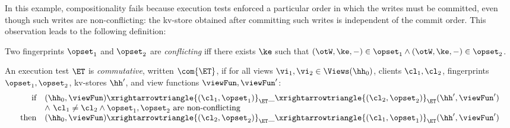 In this example, compositionality fails because execution tests 
enforced a particular order in which the writes must be committed, even though such writes 
are non-conflicting: \ie the kv-store obtained after committing such writes is independent of the commit order. 
This observation leads to the following definition: 
\begin{definition}
Two fingerprints $\opset_1$ and $\opset_2$ are \emph{conflicting} 
iff there exists $\ke$ such that 
$(\otW, \ke, -) \in \opset_1 \land (\otW, \ke, -) \in \opset_2$. 

An execution test $\ET$ is \emph{commutative}, written $\com{\ET}$, if 
for all views $\vi_1, \vi_2 \in \Views(\hh_0)$, 
clients $\cl_1, \cl_2$,
fingerprints $\opset_1, \opset_2$, 
kv-stores $\hh'$,
and view functions $\viewFun, \viewFun'$:
\[
\begin{array}{@{}r @{\hspace{10pt}} l @{}}
	\text{if} &  
	(\hh_0, \viewFun) \xrightarrowtriangle{(\cl_1, \opset_1)}_{\ET} 
	\_ \xrightarrowtriangle{(\cl_2, \opset_2)}_{\ET} (\hh', \viewFun') \\
	& \land\ \cl_1 \ne \cl_2 \land \opset_1, \opset_2  \text{ are non-conflicting}\\
%
%	
	\text{then} & (\hh_0, \viewFun) \xrightarrowtriangle{(\cl_2, \opset_2)}_{\ET} 
\_ \xrightarrowtriangle{(\cl_1, \opset_1)}_{\ET} (\hh', \viewFun')
\end{array}
\]
\end{definition}

